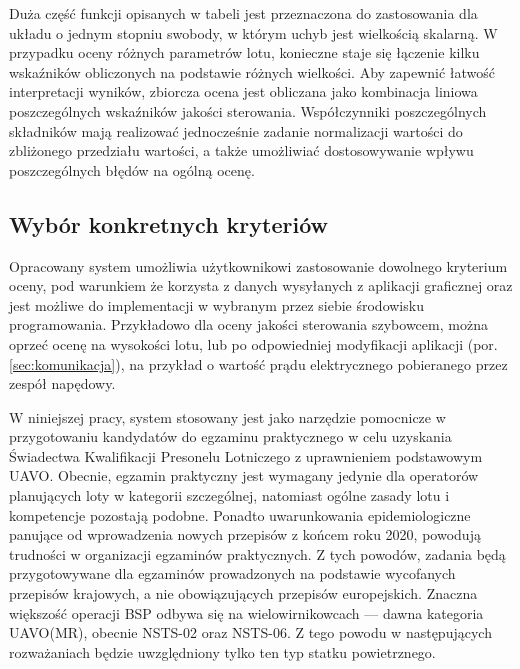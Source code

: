Duża część funkcji opisanych w tabeli jest przeznaczona do zastosowania dla układu o jednym stopniu swobody, w którym uchyb jest wielkością skalarną. W przypadku oceny różnych parametrów lotu, konieczne staje się łączenie kilku wskaźników obliczonych na podstawie różnych wielkości. Aby zapewnić łatwość interpretacji wyników, zbiorcza ocena jest obliczana jako kombinacja liniowa poszczególnych wskaźników jakości sterowania. Współczynniki poszczególnych składników mają realizować jednocześnie zadanie normalizacji wartości do zbliżonego przedziału wartości, a także umożliwiać dostosowywanie wpływu poszczególnych błędów na ogólną ocenę.

\subsection{Wybór konkretnych kryteriów}
Opracowany system umożliwia użytkownikowi zastosowanie dowolnego kryterium oceny, pod warunkiem że korzysta z  danych wysyłanych z aplikacji graficznej oraz jest możliwe do implementacji w wybranym przez siebie środowisku programowania. Przykładowo dla oceny jakości sterowania szybowcem, można oprzeć ocenę na wysokości lotu, lub po odpowiedniej modyfikacji aplikacji (por. \ref{sec:komunikacja}), na przykład o wartość prądu elektrycznego pobieranego przez zespół napędowy.

W niniejszej pracy, system stosowany jest jako narzędzie pomocnicze w przygotowaniu kandydatów do egzaminu praktycznego w celu uzyskania Świadectwa Kwalifikacji Presonelu Lotniczego z uprawnieniem podstawowym UAVO. Obecnie, egzamin praktyczny jest wymagany jedynie dla operatorów planujących loty w kategorii szczególnej\cite{ulc2019}, natomiast ogólne zasady lotu i kompetencje pozostają podobne. Ponadto uwarunkowania epidemiologiczne panujące od wprowadzenia nowych przepisów z końcem roku 2020, powodują trudności w organizacji egzaminów praktycznych. Z tych powodów, zadania będą przygotowywane dla egzaminów prowadzonych na podstawie wycofanych przepisów krajowych, a nie obowiązujących przepisów europejskich. Znaczna większość operacji BSP odbywa się na wielowirnikowcach --- dawna kategoria UAVO(MR), obecnie NSTS-02 oraz NSTS-06. Z tego powodu w następujących rozważaniach będzie uwzględniony tylko ten typ statku powietrznego.

